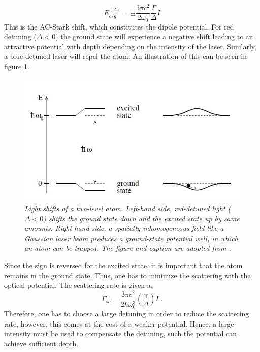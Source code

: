 \begin{equation}
	E_{e/g}^{(2)}=\pm \frac{3 \pi c^2}{2 \omega_0} \frac{\Gamma}{\Delta}I
	\label{dipolepot}
\end{equation}
This is the AC-Stark shift, which constitutes the dipole potential. For red detuning ($\Delta < 0$) the ground state will experience a negative shift leading to an attractive potential with depth depending on the intensity of the laser. Similarly, a blue-detuned laser will repel the atom. An illustration of this can be seen in figure \ref{fig:ac_stark}.
\begin{figure}[!h]
	\centering
	\includegraphics[width=0.5\columnwidth]{Figures/acstark.JPG} 
	\caption{\textit{Light shifts of a two-level atom. Left-hand side,
		red-detuned light ($\Delta < 0$) shifts the ground state down and the
		excited state up by same amounts. Right-hand side, a spatially
		inhomogeneous field like a Gaussian laser beam produces a
		ground-state potential well, in which an atom can be trapped. The figure and 		caption are adopted from \cite{grimm}.}}
	\label{fig:ac_stark} 
\end{figure}
Since the sign is reversed for the excited state, it is important that the atom remains in the ground state. Thus, one has to minimize the scattering with the optical potential. The scattering rate is given as \cite{grimm}
\begin{equation}
	\Gamma_{sc} = \frac{3 \pi c^2}{2 \hbar \omega_{0}^3} \left( \frac{\gamma}{\Delta} \right) I \; .
\end{equation}
Therefore, one has to choose a large detuning in order to reduce the scattering rate, however, this comes at the cost of a weaker potential. Hence, a large intensity must be used to compensate the detuning, such the potential can achieve sufficient depth.